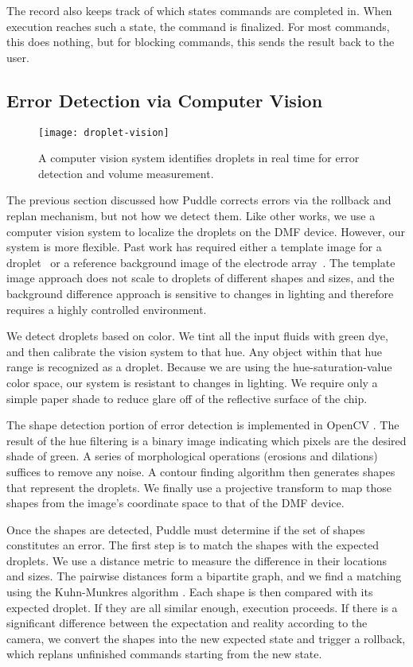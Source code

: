 \documentclass[sigconf, screen]{acmart}
\begin{document}
The record also keeps track of which states commands are completed in.
When execution reaches such a state, the command is finalized.
For most commands, this does nothing, but for blocking commands, this sends the result back to the user.

\subsection{Error Detection via Computer Vision}
\label{sec:vision}

\begin{figure}
  \centering
  \texttt{[image: droplet-vision]}
  \caption{
    A computer vision system identifies droplets in real time for error detection and volume measurement.
  }
  \label{fig:tracking}
\end{figure}

The previous section discussed how Puddle corrects errors via the rollback and replan mechanism, but not how we detect them.
Like other works, we use a computer vision system to localize the droplets on the DMF device.
However, our system is more flexible.
Past work has required either a template image for a droplet~\cite{luo2013error} or a reference background image of the electrode array~\cite{shin2010vision, vo2017image-dmf}.
The template image approach does not scale to droplets of different shapes and sizes, and the background difference approach is sensitive to changes in lighting and therefore requires a highly controlled environment.

We detect droplets based on color.
We tint all the input fluids with green dye, and then calibrate the vision system to that hue.
Any object within that hue range is recognized as a droplet.
Because we are using the hue-saturation-value color space, our system is resistant to changes in lighting.
We require only a simple paper shade to reduce glare off of the reflective surface of the chip.

The shape detection portion of error detection is implemented in OpenCV \cite{opencv}.
The result of the hue filtering is a binary image indicating which pixels are the desired shade of green.
A series of morphological operations (erosions and dilations) suffices to remove any noise.
A contour finding algorithm \cite{findcontours} then generates shapes that represent the droplets.
We finally use a projective transform to map those shapes from the image's coordinate space to that of the DMF device.

Once the shapes are detected, Puddle must determine if the set of shapes constitutes an error.
The first step is to match the shapes with the expected droplets.
We use a distance metric to measure the difference in their locations and sizes.
The pairwise distances form a bipartite graph, and we find a matching using the Kuhn-Munkres algorithm \cite{munkres}.
Each shape is then compared with its expected droplet.
If they are all similar enough, execution proceeds.
If there is a significant difference between the expectation and reality according to the camera, we convert the shapes into the new expected state and trigger a rollback, which replans unfinished commands starting from the new state.
\end{document}
